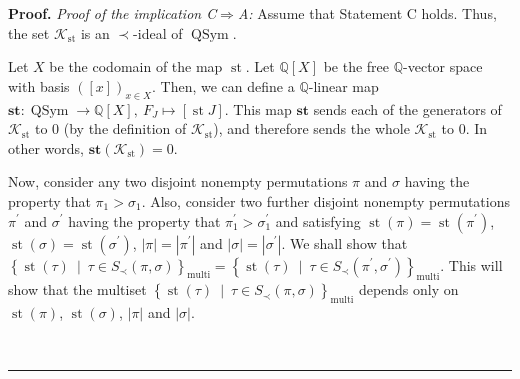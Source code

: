 \documentclass[numbers=enddot,12pt,final,onecolumn,notitlepage]{scrartcl}%
\theoremstyle{definition}
\newenvironment{proof}[1][Proof]{\noindent\textbf{#1.} }{\ \rule{0.5em}{0.5em}}
\newenvironment{verlong}{}{}
\begin{document}
\begin{verlong}
\begin{proof}
\textit{Proof of the implication C}$\Longrightarrow$\textit{A:} Assume that
Statement C holds. Thus, the set $\mathcal{K}_{\operatorname*{st}}$ is an
$\left.  \prec\right.  $-ideal of $\operatorname*{QSym}$.

Let $X$ be the codomain of the map $\operatorname*{st}$. Let $\mathbb{Q}%
\left[  X\right]  $ be the free $\mathbb{Q}$-vector space with basis $\left(
\left[  x\right]  \right)  _{x\in X}$. Then, we can define a $\mathbb{Q}%
$-linear map $\mathbf{st}:\operatorname*{QSym}\rightarrow\mathbb{Q}\left[
X\right]  ,\ F_{J}\mapsto\left[  \operatorname*{st}J\right]  $. This map
$\mathbf{st}$ sends each of the generators of $\mathcal{K}_{\operatorname*{st}%
}$ to $0$ (by the definition of $\mathcal{K}_{\operatorname*{st}}$), and
therefore sends the whole $\mathcal{K}_{\operatorname*{st}}$ to $0$. In other
words, $\mathbf{st}\left(  \mathcal{K}_{\operatorname*{st}}\right)  =0$.

Now, consider any two disjoint nonempty permutations $\pi$ and $\sigma$ having
the property that $\pi_{1}>\sigma_{1}$. Also, consider two further disjoint
nonempty permutations $\pi^{\prime}$ and $\sigma^{\prime}$ having the property
that $\pi_{1}^{\prime}>\sigma_{1}^{\prime}$ and satisfying $\operatorname*{st}%
\left(  \pi\right)  =\operatorname*{st}\left(  \pi^{\prime}\right)  $,
$\operatorname*{st}\left(  \sigma\right)  =\operatorname*{st}\left(
\sigma^{\prime}\right)  $, $\left\vert \pi\right\vert =\left\vert \pi^{\prime
}\right\vert $ and $\left\vert \sigma\right\vert =\left\vert \sigma^{\prime
}\right\vert $. We shall show that $\left\{  \operatorname*{st}\left(
\tau\right)  \ \mid\ \tau\in S_{\prec}\left(  \pi,\sigma\right)  \right\}
_{\operatorname*{multi}}=\left\{  \operatorname*{st}\left(  \tau\right)
\ \mid\ \tau\in S_{\prec}\left(  \pi^{\prime},\sigma^{\prime}\right)
\right\}  _{\operatorname*{multi}}$. This will show that the multiset
$\left\{  \operatorname*{st}\left(  \tau\right)  \ \mid\ \tau\in S_{\prec
}\left(  \pi,\sigma\right)  \right\}  _{\operatorname*{multi}}$ depends only
on $\operatorname*{st}\left(  \pi\right)  $, $\operatorname*{st}\left(
\sigma\right)  $, $\left\vert \pi\right\vert $ and $\left\vert \sigma
\right\vert $.


\end{proof}
\end{verlong}
\end{document}
